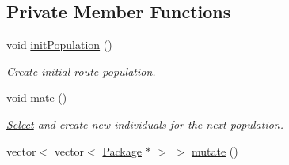 \subsection*{Private Member Functions}
\begin{DoxyCompactItemize}
\item 
void \hyperlink{classGenetic_a8fc0ba91c031e9606a63bee4efa15fd9}{init\+Population} ()\hypertarget{classGenetic_a8fc0ba91c031e9606a63bee4efa15fd9}{}\label{classGenetic_a8fc0ba91c031e9606a63bee4efa15fd9}

\begin{DoxyCompactList}\small\item\em Create initial route population. \end{DoxyCompactList}\item 
void \hyperlink{classGenetic_aeedbeff783efea2c64f0df27828358dc}{mate} ()\hypertarget{classGenetic_aeedbeff783efea2c64f0df27828358dc}{}\label{classGenetic_aeedbeff783efea2c64f0df27828358dc}

\begin{DoxyCompactList}\small\item\em \hyperlink{structSelect}{Select} and create new individuals for the next population. \end{DoxyCompactList}\item 
vector$<$ vector$<$ \hyperlink{classPackage}{Package} $\ast$ $>$ $>$ \hyperlink{classGenetic_a808465822bfbe3b9400cd19df82b7da6}{mutate} ()\hypertarget{classGenetic_a808465822bfbe3b9400cd19df82b7da6}{}\label{classGenetic_a808465822bfbe3b9400cd19df82b7da6}


\end{DoxyCompactItemize}

